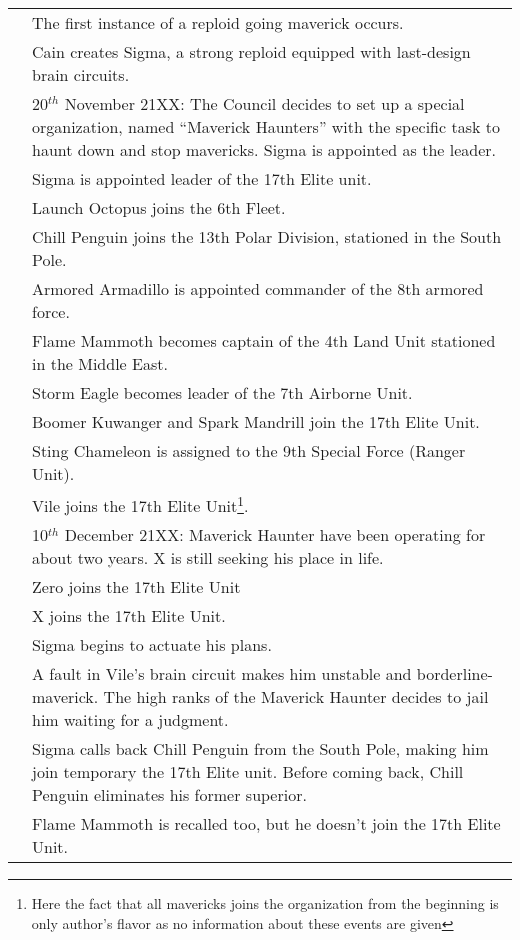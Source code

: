 \begin{tabularx}{\linewidth}{l X}
	\tabdot& The first instance of a reploid going maverick occurs.\\
	\tabdot& Cain creates Sigma, a strong reploid equipped with last-design brain circuits.\\
	\tabdot& 20$^{th}$ November 21XX: The Council decides to set up a special organization, named ``Maverick Haunters'' with the specific task to haunt down and stop mavericks. Sigma is appointed as the leader.\\
	\tabline& Sigma is appointed leader of the 17th Elite unit.\\
	\tabline& Launch Octopus joins the 6th Fleet.\\
	\tabline& Chill Penguin joins the 13th Polar Division, stationed in the South Pole.\\
	\tabline& Armored Armadillo is appointed commander of the 8th armored force.\\
	\tabline& Flame Mammoth becomes captain of the 4th Land Unit stationed in the Middle East.\\
	\tabline& Storm Eagle becomes leader of the 7th Airborne Unit.\\
	\tabline& Boomer Kuwanger and Spark Mandrill join the 17th Elite Unit.\\
	\tabline& Sting Chameleon is assigned to the 9th Special Force (Ranger Unit).\\
	\tabline& Vile joins the 17th Elite Unit\footnote{Here the fact that all mavericks joins the organization from the beginning is only author's flavor as no information about these events are given}.\\
	\tabdot& 10$^{th}$ December 21XX: Maverick Haunter have been operating for about two years. X is still seeking his place in life.\\
	\tabdot& Zero joins the 17th Elite Unit\\
	\tabdot& X joins the 17th Elite Unit.\\
	\tabdot& Sigma begins to actuate his plans.\\
	\tabdot& A fault in Vile's brain circuit makes him unstable and borderline-maverick. The high ranks of the Maverick Haunter decides to jail him waiting for a judgment.\\
	\tabdot& Sigma calls back Chill Penguin from the South Pole, making him join temporary the 17th Elite unit. Before coming back, Chill Penguin eliminates his former superior.\\
	\tabline& Flame Mammoth is recalled too, but he doesn't join the 17th Elite Unit.\\

\end{tabularx}
